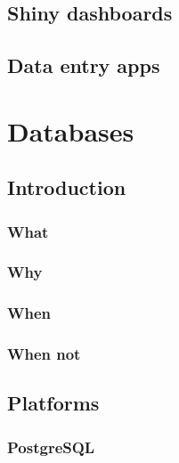 \documentclass[
]{book}
\begin{document}
\hypertarget{shiny-dashboards}{%
\chapter{Shiny dashboards}\label{shiny-dashboards}}

\hypertarget{data-entry-apps}{%
\chapter{Data entry apps}\label{data-entry-apps}}

\hypertarget{part-databases}{%
\part{Databases}\label{part-databases}}

\hypertarget{introduction-1}{%
\chapter{Introduction}\label{introduction-1}}

\hypertarget{what}{%
\section{What}\label{what}}

\hypertarget{why}{%
\section{Why}\label{why}}

\hypertarget{when}{%
\section{When}\label{when}}

\hypertarget{when-not}{%
\section{When not}\label{when-not}}

\hypertarget{platforms}{%
\chapter{Platforms}\label{platforms}}

\hypertarget{postgresql}{%
\section{PostgreSQL}\label{postgresql}}
\end{document}
